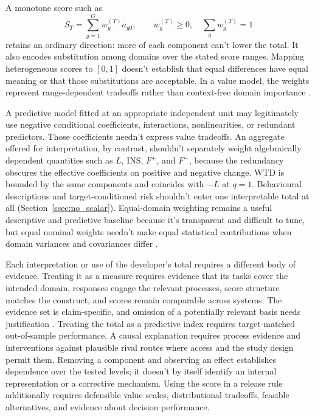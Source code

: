 \documentclass[12pt]{article}
\begin{document}
A monotone score such as
\[
S_T=\sum_{g=1}^{G}w_g^{(T)}a_{g0},
\qquad
w_g^{(T)}\geq0,\quad \sum_gw_g^{(T)}=1
\]
retains an ordinary direction: more of each component can't lower the total. It also encodes substitution among domains over the stated score ranges. Mapping heterogeneous scores to \([0,1]\) doesn't establish that equal differences have equal meaning or that those substitutions are acceptable. In a value model, the weights represent range-dependent tradeoffs rather than context-free domain importance \citep{KeeneyRaiffa1993}.

A predictive model fitted at an appropriate independent unit may legitimately use negative conditional coefficients, interactions, nonlinearities, or redundant predictors. Those coefficients needn't express value tradeoffs. An aggregate offered for interpretation, by contrast, shouldn't separately weight algebraically dependent quantities such as \(L\), INS, \(F^+\), and \(F^-\), because the redundancy obscures the effective coefficients on positive and negative change. WTD is bounded by the same components and coincides with \(-L\) at \(q=1\). Behavioural descriptions and target-conditioned risk shouldn't enter one interpretable total at all (Section~\ref{ssec:no_scalar}). Equal-domain weighting remains a useful descriptive and predictive baseline because it's transparent and difficult to tune, but equal nominal weights needn't make equal statistical contributions when domain variances and covariances differ \citep[305--308]{brennan2001generalizability}.

Each interpretation or use of the developer's total requires a different body of evidence. Treating it as a measure requires evidence that its tasks cover the intended domain, responses engage the relevant processes, score structure matches the construct, and scores remain comparable across systems. The evidence set is claim-specific, and omission of a potentially relevant basis needs justification \citep[744, 747]{messick1995Validity}. Treating the total as a predictive index requires target-matched out-of-sample performance. A causal explanation requires process evidence and interventions against plausible rival routes where access and the study design permit them. Removing a component and observing an effect establishes dependence over the tested levels; it doesn't by itself identify an internal representation or a corrective mechanism. Using the score in a release rule additionally requires defensible value scales, distributional tradeoffs, feasible alternatives, and evidence about decision performance.
\end{document}
